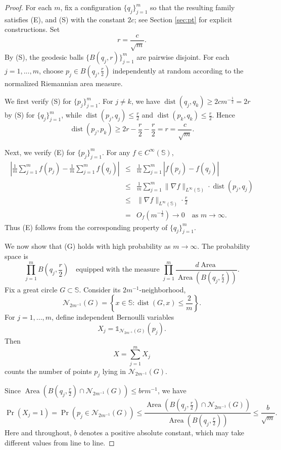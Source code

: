 \documentclass[12pt,reqno]{amsart}
\DeclareMathOperator{\Area}{Area}
\DeclareMathOperator{\dist}{dist}
\newcommand{\indicator}{\mathds{1}}
\newcommand{\Nc}{\mathcal{N}}
\newcommand{\Sb}{\mathbb{S}}
\theoremstyle{plain}
\theoremstyle{definition}
\theoremstyle{remark}
\numberwithin{equation}{section}
\begin{document}
\begin{proof}
For each $m$, fix a configuration $\{q_j\}_{j=1}^m$ so that the resulting family satisfies (E), and (S) with the constant $2c$; see Section \ref{sec:pt} for explicit constructions. Set
$$r=\frac{c}{\sqrt m}.$$
By (S), the geodesic balls $\{B(q_j,r)\}_{j=1}^m$ are pairwise disjoint. For each $j=1,...,m$, choose $p_j\in B(q_j,\frac r2)$ independently at random according to the normalized Riemannian area measure. 

We first verify (S) for $\{p_j\}_{j=1}^m$. For $j\ne k$, we have $\dist(q_j,q_k)\ge2cm^{-\frac12}=2r$ by (S) for $\{q_j\}_{j=1}^m$, while $\dist(p_j,q_j)\le\frac r2$ and $\dist(p_k,q_k)\le\frac r2$. Hence
$$\dist\left(p_j,p_k\right)\ge2r-\frac r2-\frac r2=r=\frac{c}{\sqrt m}.$$

Next, we verify (E) for $\{p_j\}_{j=1}^m$. For any $f\in C^\infty(\Sb)$,
\begin{eqnarray*}
\left|\frac1m\sum_{j=1}^mf\left(p_j\right)-\frac1m\sum_{j=1}^mf\left(q_j\right)\right|&\le&\frac1m\sum_{j=1}^m\left|f\left(p_j\right)-f\left(q_j\right)\right|\\
&\le&\frac1m\sum_{j=1}^m\|\nabla f\|_{L^\infty(\Sb)}\cdot\dist\left(p_j,q_j\right)\\
&\le&\|\nabla f\|_{L^\infty(\Sb)}\cdot\frac r2\\
&=&O_f\left(m^{-\frac12}\right)\to0\quad\text{as }m\to\infty.
\end{eqnarray*}
Thus (E) follows from the corresponding property of $\{q_j\}_{j=1}^m$.

We now show that (G) holds with high probability as $m\to\infty$. The probability space is
$$\prod_{j=1}^mB\left(q_j,\frac r2\right)\quad\text{equipped with the measure }\prod_{j=1}^m\frac{d\Area}{\Area\left(B\left(q_j,\frac r2\right)\right)}.$$
Fix a great circle $G\subset\Sb$. Consider its $2m^{-1}$-neighborhood,
$$\Nc_{2m^{-1}}(G)=\left\{x\in\Sb:\dist(G,x)\le\frac2m\right\}.$$ 
For $j=1,...,m$, define independent Bernoulli variables
$$X_j=\indicator_{\Nc_{2m^{-1}}(G)}\left(p_j\right).$$ 
Then 
$$X=\sum_{j=1}^m X_j$$
counts the number of points $p_j$ lying in $\Nc_{2m^{-1}}(G)$.

Since $\Area(B(q_j,\frac r2)\cap\Nc_{2m^{-1}}(G))\le brm^{-1}$, we have
$$\Pr\left(X_j=1\right)=\Pr\left(p_j\in\Nc_{2m^{-1}}(G)\right)\le\frac{\Area\left(B\left(q_j,\frac r2\right)\cap\Nc_{2m^{-1}}(G)\right)}{\Area\left(B\left(q_j,\frac r2\right)\right)}\le\frac{b}{\sqrt m}.$$
Here and throughout, $b$ denotes a positive absolute constant, which may take different values from line to line.


\end{proof}
\end{document}
